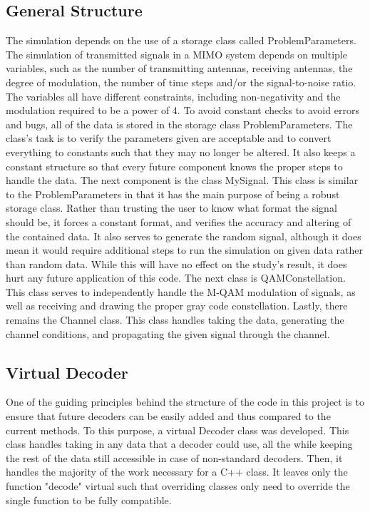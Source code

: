 \documentclass[conference]{IEEEtran}
\begin{document}
\subsection{General Structure}
The simulation depends on the use of a storage class called ProblemParameters. The simulation of transmitted signals in a MIMO system depends on multiple variables, such as the number of transmitting antennas, receiving antennas, the degree of modulation, the number of time steps and/or the signal-to-noise ratio. The variables all have different constraints, including non-negativity and the modulation required to be a power of 4. To avoid constant checks to avoid errors and bugs, all of the data is stored in the storage class ProblemParameters. The class’s task is to verify the parameters given are acceptable and to convert everything to constants such that they may no longer be altered. It also keeps a constant structure so that every future component knows the proper steps to handle the data.
The next component is the class MySignal. This class is similar to the ProblemParameters in that it has the main purpose of being a robust storage class. Rather than trusting the user to know what format the signal should be, it forces a constant format, and verifies the accuracy and altering of the contained data. It also serves to generate the random signal, although it does mean it would require additional steps to run the simulation on given data rather than random data. While this will have no effect on the study’s result, it does hurt any future application of this code.
The next class is QAMConstellation. This class serves to independently handle the M-QAM modulation of signals, as well as receiving and drawing the proper gray code constellation.
Lastly, there remains the Channel class. This class handles taking the data, generating the channel conditions, and propagating the given signal through the channel.

\subsection{Virtual Decoder}
One of the guiding principles behind the structure of the code in this project is to ensure that future decoders can be easily added and thus compared to the current methods. To this purpose, a virtual Decoder class was developed. This class handles taking in any data that a decoder could use, all the while keeping the rest of the data still accessible in case of non-standard decoders. Then, it handles the majority of the work necessary for a C++ class. It leaves only the function "decode" virtual such that overriding classes only need to override the single function to be fully compatible. 
\end{document}
